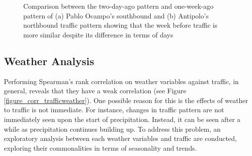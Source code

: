 \begin{figure}[!t] 
\centering
    \centering
      \captionsetup{justification=centering}
    \hfill
    \caption{Comparison between the two-day-ago pattern and one-week-ago pattern of (a) Pablo Ocampo’s southbound and (b) Antipolo’s northbound traffic pattern showing that the week before traffic is more similar despite its difference in terms of days}

    \label{figure_traffic_day_vs_week}
\end{figure}




\subsection{Weather Analysis}

Performing Spearman's rank correlation on weather variables against traffic, in general, reveals that they have a weak correlation (see Figure \ref{figure_corr_trafficweather}). One possible reason for this is the effects of weather to traffic is not immediate. For instance, changes in traffic pattern are not immediately seen upon the start of precipitation. Instead, it can be seen after a while as precipitation continues building up. To address this problem, an exploratory analysis between each weather variables and traffic are conducted, exploring their commonalities in terms of seasonality and trends.


